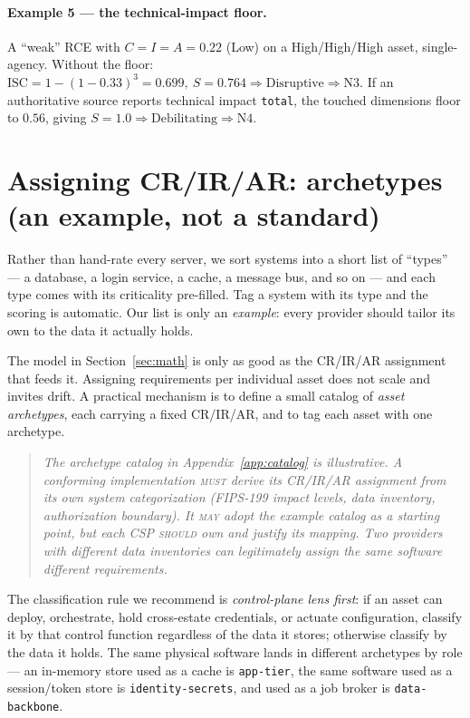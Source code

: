 \documentclass[11pt]{article}
\newcommand{\code}[1]{\texttt{#1}}
\newcommand{\rfckw}[1]{\textsc{#1}}
\begin{document}
\paragraph{Example 5 --- the technical-impact floor.}
A ``weak'' RCE with $C\!=\!I\!=\!A\!=\!0.22$ (Low) on a High/High/High asset,
single-agency. Without the floor:
\(
\mathrm{ISC}=1-(1-0.33)^3=0.699,\ S=0.764\Rightarrow\text{Disruptive}\Rightarrow\text{N3}.
\)
If an authoritative source reports technical impact \code{total}, the touched
dimensions floor to $0.56$, giving $S=1.0 \Rightarrow \text{Debilitating}
\Rightarrow \boxed{\text{N4}}$.

\section{Assigning CR/IR/AR: archetypes (an example, not a standard)}
\label{sec:archetypes}
\begin{plain}
Rather than hand-rate every server, we sort systems into a short list of ``types''
--- a database, a login service, a cache, a message bus, and so on --- and each type
comes with its criticality pre-filled. Tag a system with its type and the scoring is
automatic. Our list is only an \emph{example}: every provider should tailor its own
to the data it actually holds.
\end{plain}
The model in Section~\ref{sec:math} is only as good as the CR/IR/AR assignment that
feeds it. Assigning requirements per individual asset does not scale and invites
drift. A practical mechanism is to define a small catalog of \emph{asset
archetypes}, each carrying a fixed CR/IR/AR, and to tag each asset with one
archetype.

\begin{quote}\itshape
The archetype catalog in Appendix~\ref{app:catalog} is illustrative. A conforming
implementation \rfckw{must} derive its CR/IR/AR assignment from its own system
categorization (FIPS-199 impact levels, data inventory, authorization boundary). It
\rfckw{may} adopt the example catalog as a starting point, but each CSP
\rfckw{should} own and justify its mapping. Two providers with different data
inventories can legitimately assign the same software different requirements.
\end{quote}

The classification rule we recommend is \emph{control-plane lens first}: if an
asset can deploy, orchestrate, hold cross-estate credentials, or actuate
configuration, classify it by that control function regardless of the data it
stores; otherwise classify by the data it holds. The same physical software lands
in different archetypes by role --- an in-memory store used as a cache is
\code{app-tier}, the same software used as a session/token store is
\code{identity-secrets}, and used as a job broker is \code{data-backbone}.
\end{document}
